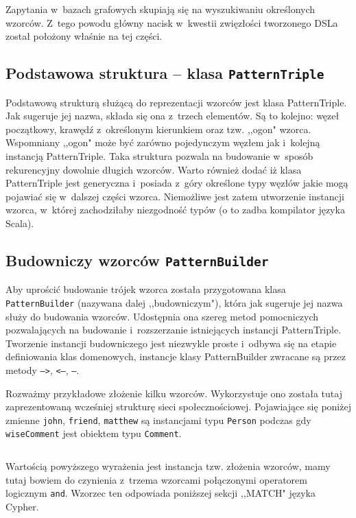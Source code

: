 \documentclass[brudnopis]{xmgr}
\begin{document}
Zapytania w~bazach grafowych skupiają się na wyszukiwaniu określonych wzorców. Z~tego powodu główny nacisk w~kwestii zwięzłości tworzonego DSLa został położony właśnie na tej części.

\subsection{Podstawowa struktura -- klasa \texttt{PatternTriple}}
Podstawową strukturą służącą do reprezentacji wzorców jest klasa PatternTriple. Jak sugeruje jej nazwa, składa się ona z~trzech elementów. Są to kolejno: węzeł początkowy, krawędź z~określonym kierunkiem oraz tzw. ,,ogon" wzorca. Wspomniany ,,ogon" może być zarówno pojedynczym węzłem jak i~kolejną instancją PatternTriple. Taka struktura pozwala na budowanie w~sposób rekurencyjny dowolnie długich wzorców. Warto również dodać iż klasa PatternTriple jest generyczna i~posiada z~góry określone typy węzłów jakie mogą pojawiać się w~dalszej części wzorca. Niemożliwe jest zatem utworzenie instancji wzorca, w~której zachodziłaby niezgodność typów (o to zadba kompilator języka Scala).

\subsection{Budowniczy wzorców \texttt{PatternBuilder}}
Aby uprościć budowanie trójek wzorca została przygotowana klasa \texttt{PatternBuilder} (nazywana dalej ,,budowniczym"), która jak sugeruje jej nazwa służy do budowania wzorców. Udostępnia ona szereg metod pomocniczych pozwalających na budowanie i~rozszerzanie istniejących instancji PatternTriple. Tworzenie instancji budowniczego jest niezwykle proste i~odbywa się na etapie definiowania klas domenowych, instancje klasy PatternBuilder zwracane są przez metody \texttt{-->}, \texttt{<--}, \texttt{--}.

Rozważmy przykładowe złożenie kilku wzorców. Wykorzystuje ono została tutaj zaprezentowaną wcześniej strukturę sieci społecznościowej. Pojawiające się poniżej zmienne \texttt{john}, \texttt{friend}, \texttt{matthew} są instancjami typu \texttt{Person} podczas gdy \texttt{wiseComment} jest obiektem typu \texttt{Comment}.

\inputminted{scala}{listings/scala/dsl/patterns/functional-example-1.scala}

Wartością powyższego wyrażenia jest instancja tzw. złożenia wzorców, mamy tutaj bowiem do czynienia z~trzema wzorcami połączonymi operatorem logicznym \texttt{and}. Wzorzec ten odpowiada poniższej sekcji ,,MATCH" języka Cypher.
\end{document}

